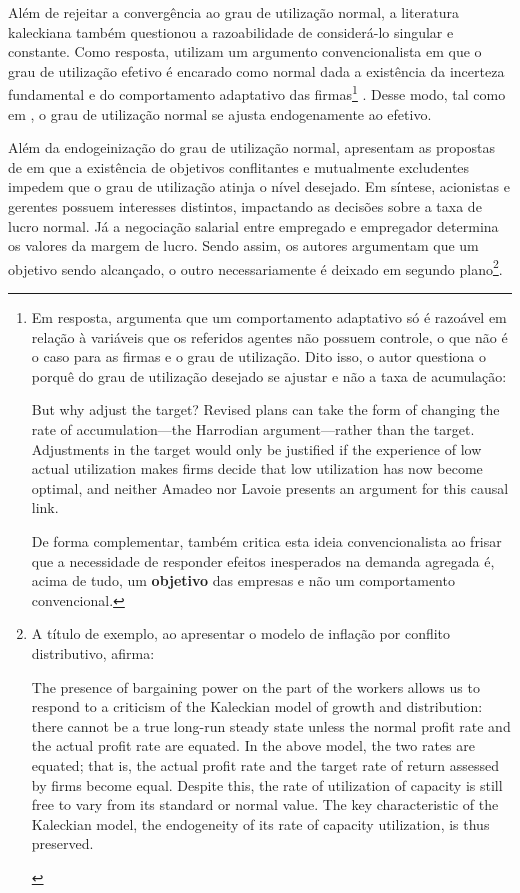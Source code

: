 Além de rejeitar a convergência ao grau de utilização normal, a literatura kaleckiana também questionou a razoabilidade de considerá-lo singular e constante. 
Como resposta, utilizam um argumento convencionalista em que o grau de utilização efetivo é encarado como normal dada a existência da incerteza fundamental e do comportamento adaptativo das firmas\footnote{
	Em resposta, \textcite{skott_theoretical_2012} argumenta que um comportamento adaptativo só é razoável em relação à variáveis que os referidos agentes não possuem controle, o que não é o caso para as firmas e o grau de utilização. Dito isso, o autor questiona o porquê do grau de utilização desejado se ajustar e não a taxa de acumulação:
	
	\begin{citacao}
		But why adjust the target? Revised plans can take the form of changing the rate of accumulation—the Harrodian argument—rather than the target. Adjustments in the target would only be justified if the experience of low actual utilization makes firms decide that low utilization has now become optimal, and neither Amadeo nor Lavoie presents an argument for this causal link. \cite[p.120]{skott_theoretical_2012}
	\end{citacao}
	De forma complementar, \textcite{nikiforos_utilization_2016} também critica esta ideia convencionalista ao frisar que a necessidade de responder efeitos inesperados na demanda agregada é, acima de tudo, um \textbf{objetivo} das empresas e não um comportamento convencional. 
} \cite{lavoie_kaleckian_1995}. Desse modo, tal como em \textcite{amadeo_role_1986}, o grau de utilização normal se ajusta endogenamente ao efetivo. 

Além da endogeinização do grau de utilização normal, \textcite{hein_harrodian_2012} apresentam as propostas de \textcite{dallery_conflicting_2011} em que a existência de objetivos conflitantes e mutualmente excludentes impedem que o grau de utilização atinja o nível desejado. Em síntese, acionistas e gerentes possuem interesses distintos, impactando as decisões sobre a taxa de lucro normal. Já a negociação salarial entre empregado e empregador determina os valores da margem de lucro. Sendo assim, os autores argumentam que um objetivo sendo alcançado, o outro necessariamente é deixado em segundo plano\footnote{
	A título de exemplo, ao apresentar o modelo de inflação por conflito distributivo, \textcite[p.~567]{lavoie_post-keynesian_2015} afirma:
	\begin{citacao}
		The presence of bargaining power on the part of the workers allows
		us to respond to a criticism of the Kaleckian model of growth and distribution: there
		cannot be a true long-run steady state unless the normal profit rate and the actual profit
		rate are equated. In the above model, the two rates are equated; that is, the actual profit
		rate and the target rate of return assessed by firms become equal. Despite this, the rate
		of utilization of capacity is still free to vary from its standard or normal value. The key
		characteristic of the Kaleckian model, the endogeneity of its rate of capacity utilization,
		is thus preserved.
	\end{citacao}
}.

